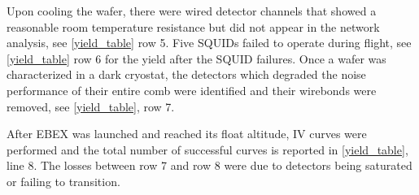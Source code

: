 Upon cooling the wafer, there were wired detector channels that showed a reasonable room temperature resistance but did not appear in the network analysis, see \TAB\ref{yield_table} row 5. 
Five \ac{SQUID}s failed to operate during flight, see \TAB\ref{yield_table} row 6 for the yield after the \ac{SQUID} failures. 
Once a wafer was characterized in a dark cryostat, the detectors which degraded the noise performance of their entire comb were identified and their wirebonds were removed, see \TAB\ref{yield_table}, row 7. 

After \ac{EBEX} was launched and reached its float altitude, IV curves were performed and the total number of successful curves is reported in \TAB\ref{yield_table}, line 8. 
The losses between row 7 and row 8 were due to detectors being saturated or failing to transition. 

